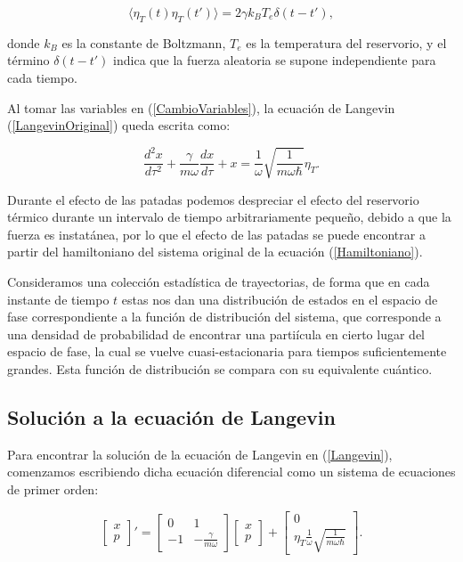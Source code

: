 \documentclass[letterpaper,12pt,oneside]{book}
\begin{document}
	\begin{equation}\label{EtaTemperatura}
		\langle \eta_T(t)\eta_T(t') \rangle = 2\gamma k_B T_e\delta(t-t'),
	\end{equation}
	
	\noindent donde $k_B$ es la constante de Boltzmann, $T_e$ es la temperatura del reservorio, y el t\'ermino $\delta(t-t')$ indica que la fuerza aleatoria se supone independiente para cada tiempo. 
	
	Al tomar las variables en (\ref{CambioVariables}), la ecuaci\'on de Langevin (\ref{LangevinOriginal}) queda escrita como:
	
	\begin{equation}\label{Langevin}
		\frac{d^2x}{d\tau^2} + \frac{\gamma}{m\omega}\frac{dx}{d\tau} + x = \frac{1}{\omega}\sqrt{\frac{1}{m\omega\hbar}}\eta_T.
	\end{equation} 
	
	Durante el efecto de las patadas podemos despreciar el efecto del reservorio t\'ermico durante un intervalo de tiempo arbitrariamente pequeño, debido a que la fuerza es instat\'anea, por lo que el efecto de las patadas se puede encontrar a partir del hamiltoniano del sistema original de la ecuaci\'on (\ref{Hamiltoniano}).
	
	
	Consideramos una colecci\'on estad\'istica de trayectorias, de forma que en cada instante de tiempo $t$ estas nos dan una distribuci\'on de estados en el espacio de fase correspondiente a la funci\'on de distribuci\'on del sistema, que corresponde a una densidad de probabilidad de encontrar una parti\'icula en cierto lugar del espacio de fase, la cual se vuelve cuasi-estacionaria para tiempos suficientemente grandes. Esta funci\'on de distribuci\'on se compara con su equivalente cu\'antico.
	
	\subsection{Soluci\'on a la ecuaci\'on de Langevin}
	
	Para encontrar la soluci\'on de la ecuaci\'on de Langevin en (\ref{Langevin}), comenzamos escribiendo dicha ecuaci\'on diferencial como un sistema de ecuaciones de primer orden:
	
	\begin{equation}
		\begin{bmatrix}
		x \\ p
		\end{bmatrix}' = 
		\begin{bmatrix}
		0 & 1 \\
		-1 & -\frac{\gamma}{m\omega}
		\end{bmatrix}
		\begin{bmatrix}
		x \\ p
		\end{bmatrix} 
		+
		\begin{bmatrix}
		0 \\ \eta_T\frac{1}{\omega}\sqrt{\frac{1}{m\omega\hbar}}
		\end{bmatrix}.
	\end{equation}
	
\end{document}
